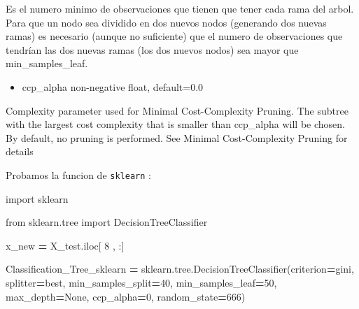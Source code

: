 \documentclass[
  11pt,
  a4paper,
]{article}
\newenvironment{Shaded}{\begin{snugshade}}{\end{snugshade}}
\newcommand{\DecValTok}[1]{\textcolor[rgb]{0.00,0.00,0.81}{#1}}
\newcommand{\ImportTok}[1]{#1}
\newcommand{\NormalTok}[1]{#1}
\newcommand{\OperatorTok}[1]{\textcolor[rgb]{0.81,0.36,0.00}{\textbf{#1}}}
\newcommand{\StringTok}[1]{\textcolor[rgb]{0.31,0.60,0.02}{#1}}
\newcommand{\VariableTok}[1]{\textcolor[rgb]{0.00,0.00,0.00}{#1}}
\providecommand{\tightlist}{%
  \setlength{\itemsep}{0pt}\setlength{\parskip}{0pt}}
\begin{document}
Es el numero minimo de observaciones que tienen que tener cada rama del
arbol. Para que un nodo sea dividido en dos nuevos nodos (generando dos
nuevas ramas) es necesario (aunque no suficiente) que el numero de
observaciones que tendrían las dos nuevas ramas (los dos nuevos nodos)
sea mayor que min\_samples\_leaf.

\begin{itemize}
\tightlist
\item
  ccp\_alpha non-negative float, default=0.0
\end{itemize}

Complexity parameter used for Minimal Cost-Complexity Pruning. The
subtree with the largest cost complexity that is smaller than ccp\_alpha
will be chosen. By default, no pruning is performed. See Minimal
Cost-Complexity Pruning for details

\newpage

Probamos la funcion de \texttt{sklearn} :

\begin{Shaded}
\begin{Highlighting}[]
\ImportTok{import}\NormalTok{ sklearn}

\ImportTok{from}\NormalTok{ sklearn.tree }\ImportTok{import}\NormalTok{ DecisionTreeClassifier}
\end{Highlighting}
\end{Shaded}

\begin{Shaded}
\begin{Highlighting}[]
\NormalTok{x\_new }\OperatorTok{=}\NormalTok{ X\_test.iloc[ }\DecValTok{8}\NormalTok{ , :]}
\end{Highlighting}
\end{Shaded}

\begin{Shaded}
\begin{Highlighting}[]
\NormalTok{Classification\_Tree\_sklearn }\OperatorTok{=}\NormalTok{ sklearn.tree.DecisionTreeClassifier(criterion}\OperatorTok{=}\StringTok{\textquotesingle{}gini\textquotesingle{}}\NormalTok{, splitter}\OperatorTok{=}\StringTok{\textquotesingle{}best\textquotesingle{}}\NormalTok{, min\_samples\_split}\OperatorTok{=}\DecValTok{40}\NormalTok{, min\_samples\_leaf}\OperatorTok{=}\DecValTok{50}\NormalTok{,  max\_depth}\OperatorTok{=}\VariableTok{None}\NormalTok{,  ccp\_alpha}\OperatorTok{=}\DecValTok{0}\NormalTok{, random\_state}\OperatorTok{=}\DecValTok{666}\NormalTok{)}
\end{Highlighting}
\end{Shaded}
\end{document}
